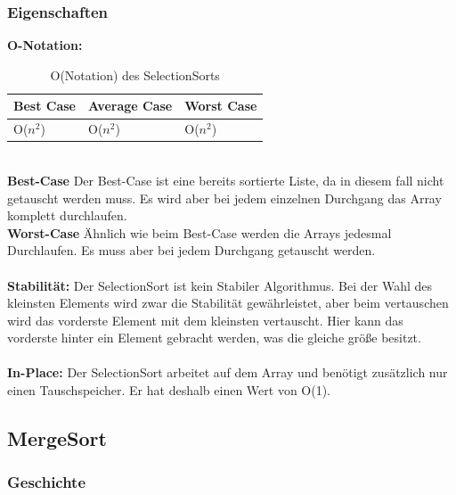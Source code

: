 \documentclass{article}
\begin{document}
\subsubsection{Eigenschaften}
\textbf{O-Notation:}
\begin{table}[h]
\centering
\begin{tabular}{lll}
	\hline
	\textbf{Best Case} & \textbf{Average Case} & \textbf{Worst Case} \\
	\hline
	O($n^{2}$) & O($n^{2}$) & O($n^{2}$) \\
	\hline
\end{tabular}
\caption{O(Notation) des SelectionSorts \cite{ONotationen}}
\label{tab:SelectionSort}
\end{table}
\\
\textbf{Best-Case} Der Best-Case ist eine bereits sortierte Liste, da in diesem fall nicht getauscht werden muss. Es wird aber bei jedem einzelnen Durchgang das Array komplett durchlaufen. \\
\textbf{Worst-Case} Ähnlich wie beim Best-Case werden die Arrays jedesmal Durchlaufen. Es muss aber bei jedem Durchgang getauscht werden.\\ \\
\textbf{Stabilität:} Der SelectionSort ist kein Stabiler Algorithmus. Bei der Wahl des kleinsten Elements wird zwar die Stabilität gewährleistet, aber beim vertauschen wird das vorderste Element mit dem kleinsten vertauscht. Hier kann das vorderste hinter ein Element gebracht werden, was die gleiche größe besitzt.   \\
\\
\textbf{In-Place:}  Der SelectionSort arbeitet auf dem Array und benötigt zusätzlich nur einen Tauschspeicher. Er hat deshalb einen Wert von O(1). \\

\subsection{MergeSort}
\subsubsection{Geschichte}
\end{document}
